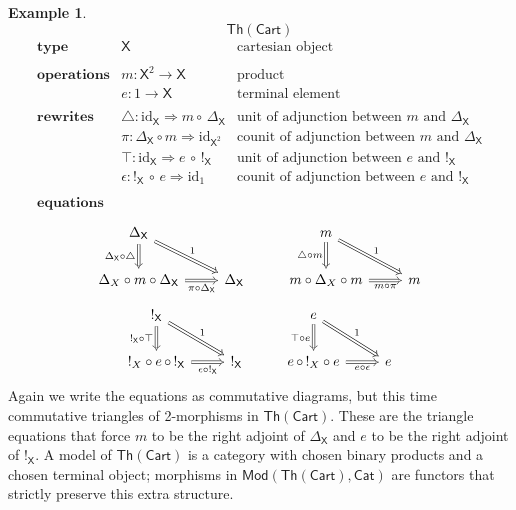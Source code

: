 \documentclass{amsart}
\theoremstyle{definition}
\newtheorem{example}[theorem]{Example}
\newcommand{\Th}{\mathsf{Th}}
\newcommand{\Cat}{\mathsf{Cat}}
\newcommand{\Mod}{\mathsf{Mod}}
\newcommand{\X}{\mathsf{X}}
\newcommand{\maps}{\colon}
\begin{document}
\begin{example}
  \[ \Th(\mathsf{Cart}) \]
  \[\begin{array}{lllllll}
      \textbf{type} &
        \X & \text{cartesian object}\\ \\
      \textbf{operations}  &
      m \maps \X^2 \to \X & \text{product} \\ 
        &  e \maps 1 \to \X & \text{terminal element} \\ \\
  \textbf{rewrites}  &
\bigtriangleup\maps \mathrm{id}_\X \Longrightarrow m \circ\, \Delta_\X & \text{unit of adjunction between $m$ and $\Delta_\X$} 
\\
&
\pi\maps \Delta_\X \circ m \Longrightarrow \mathrm{id}_{\X^2} & \text{counit of adjunction between $m$ and $\Delta_\X$} 
\\
& \top\maps \mathrm{id}_\X \Longrightarrow e \,\circ\, !_\X & \text{unit of adjunction between $e$ and $!_\X$} \\
& \epsilon \maps !_\X \, \circ \, e \Longrightarrow \mathrm{id}_{1} & \text{counit of adjunction between $e$ and $!_\X$} \\\\
 \textbf{equations}  
 \end{array}\]
\[\begin{tikzcd}
\Delta_\X \ar[Rightarrow,d,"\Delta_\X \circ \bigtriangleup",swap,""name=b1] \ar[Rightarrow,dr,"1"]
& &   
m \ar[Rightarrow,d,"\bigtriangleup \circ m",swap,""name=b1] \ar[Rightarrow,dr,"1"]  \\
         \Delta_X \circ m \circ \Delta_\X \ar[Rightarrow,r,"\pi \circ \Delta_\X",swap] & \Delta_\X & 
         m \circ \Delta_X \circ m \ar[Rightarrow,r,"m \circ \pi",swap] & m
        \end{tikzcd}\]
\[\begin{tikzcd}
!_\X \ar[Rightarrow,d,"!_\X \circ \top",swap,""name=b1] \ar[Rightarrow,dr,"1"]
& &   
e \ar[Rightarrow,d,"\top \circ e",swap,""name=b1] \ar[Rightarrow,dr,"1"]  \\
         !_X \circ e \, \circ \, !_\X \ar[Rightarrow,r,"\epsilon \circ !_\X",swap] & !_\X & 
         e \, \circ \, !_X \circ e \ar[Rightarrow,r,"e \circ \epsilon",swap] & e
        \end{tikzcd}\]
Again we write the equations as commutative diagrams, but this time commutative
triangles of 2-morphisms in $\Th(\mathsf{Cart})$.  These are the triangle equations that force $m$ to be the right adjoint of $\Delta_\X$ and $e$ to be the right adjoint of $!_\X$.  A model of $\Th(\mathsf{Cart})$ is a category with chosen binary products and a chosen terminal object; morphisms in $\Mod(\Th(\mathsf{Cart}),\Cat)$ are functors that strictly preserve this extra structure.


\end{example}
\end{document}
